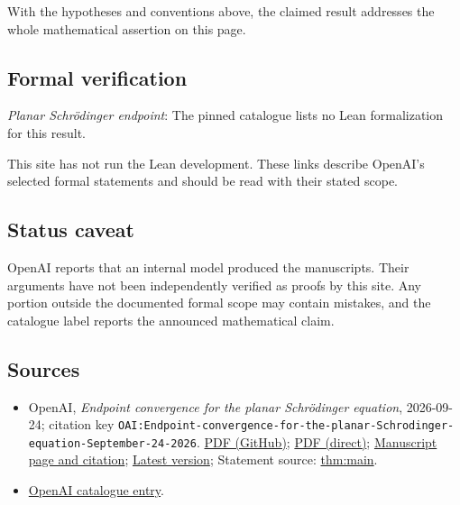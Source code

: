 \documentclass[11pt]{article}
\begin{document}
With the hypotheses and conventions above, the claimed result addresses the whole mathematical assertion on this page.

\subsection{Formal verification}
\textit{Planar Schrödinger endpoint}: The pinned catalogue lists no Lean formalization for this result.

This site has not run the Lean development. These links describe OpenAI’s selected formal statements and should be read with their stated scope.

\subsection{Status caveat}
OpenAI reports that an internal model produced the manuscripts. Their arguments have not been independently verified as proofs by this site. Any portion outside the documented formal scope may contain mistakes, and the catalogue label reports the announced mathematical claim.

\subsection{Sources}
\begin{itemize}
\item OpenAI, \emph{Endpoint convergence for the planar Schrödinger equation}, 2026-09-24; citation key \texttt{OAI:Endpoint-convergence-for-the-planar-Schrodinger-equation-September-24-2026}. \href{https://github.com/openai/math/blob/adc7f1241b42e322a6451854ab7e4b4c146bf78a/preprints/Endpoint-convergence-for-the-planar-Schrodinger-equation-September-24-2026/paper.pdf}{PDF (GitHub)}; \href{https://github.com/openai/math/raw/adc7f1241b42e322a6451854ab7e4b4c146bf78a/preprints/Endpoint-convergence-for-the-planar-Schrodinger-equation-September-24-2026/paper.pdf}{PDF (direct)}; \href{https://github.com/openai/math/blob/adc7f1241b42e322a6451854ab7e4b4c146bf78a/preprints/Endpoint-convergence-for-the-planar-Schrodinger-equation-September-24-2026/README.md}{Manuscript page and citation}; \href{https://github.com/openai/math/blob/main/preprints/Endpoint-convergence-for-the-planar-Schrodinger-equation-September-24-2026/paper.pdf}{Latest version}; Statement source: \href{https://github.com/openai/math/blob/adc7f1241b42e322a6451854ab7e4b4c146bf78a/preprints/Endpoint-convergence-for-the-planar-Schrodinger-equation-September-24-2026/build/sections/01-introduction.tex\#L23}{thm:main}.
\item \href{https://github.com/openai/math/blob/adc7f1241b42e322a6451854ab7e4b4c146bf78a/CONTENTS.md}{OpenAI catalogue entry}.
\end{itemize}
\end{document}
